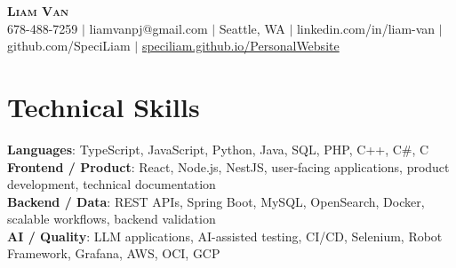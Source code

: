 \documentclass[letterpaper,11pt]{article}
\begin{document}

%
\begin{center}
    \textbf{\Huge \scshape Liam Van} \\ \vspace{1pt}
    \small 678-488-7259 $|$ \small {liamvanpj@gmail.com} $|$ Seattle, WA
 {{$|$ linkedin.com/in/liam-van} {$|$ github.com/SpeciLiam} {$|$ \href{https://speciliam.github.io/PersonalWebsite}{speciliam.github.io/PersonalWebsite}}}

\end{center}

\section{Technical Skills}
 \begin{itemize}[leftmargin=0.15in, label={}]
    \small{\item{
     \textbf{Languages}{: TypeScript, JavaScript, Python, Java, SQL, PHP, C++, C\#, C} \\
     \textbf{Frontend / Product}{: React, Node.js, NestJS, user-facing applications, product development, technical documentation} \\
     \textbf{Backend / Data}{: REST APIs, Spring Boot, MySQL, OpenSearch, Docker, scalable workflows, backend validation} \\
     \textbf{AI / Quality}{: LLM applications, AI-assisted testing, CI/CD, Selenium, Robot Framework, Grafana, AWS, OCI, GCP} \\
    }}
 \end{itemize}
%
\end{document}
